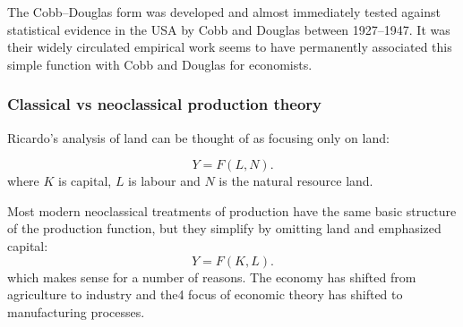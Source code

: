 The Cobb–Douglas form was developed and almost immediately tested against statistical evidence in the USA by Cobb and Douglas between 1927–1947. It was  their widely circulated empirical work seems to have permanently associated this simple function with Cobb and Douglas for economists.

\subsubsection{Classical vs neoclassical production theory}

Ricardo's analysis of land  can be thought of as focusing only on land:

\begin{equation} 
Y=F(L,N).
\label{eqn-production-ricardo-2}
\end{equation} 
where $K$ is capital, $L$ is labour and $N$  is the natural resource  land.

Most modern neoclassical treatments of production have the same basic structure of the production function, but they simplify by omitting land and emphasized capital:
\begin{equation} 
Y=F(K,L).
\label{eqn-production}
\end{equation}  
which makes sense for a number of reasons. The economy has shifted from agriculture to industry and the4 focus of economic theory has shifted to manufacturing processes.




